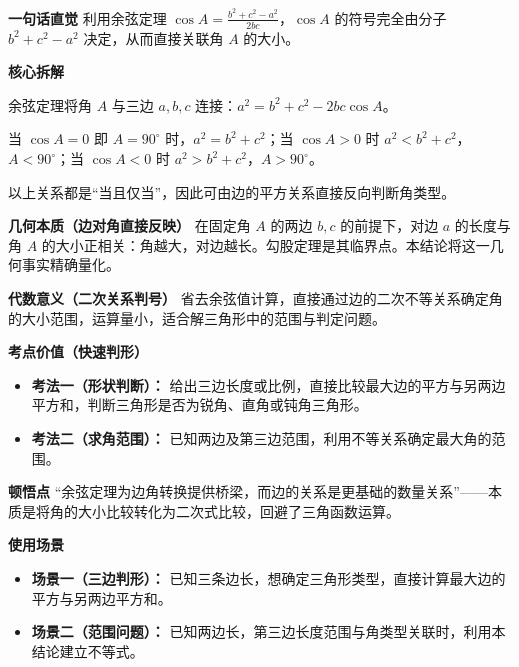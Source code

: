 \begin{explanationbox}
	\textbf{\textcolor{CExplanation}{一句话直觉}}
	利用余弦定理 $\cos A = \frac{b^2+c^2-a^2}{2bc}$，$\cos A$ 的符号完全由分子 $b^2+c^2-a^2$ 决定，从而直接关联角 $A$ 的大小。

	\medskip
	\textbf{\textcolor{CExplanation}{核心拆解}}
	\begin{description}[style=nextline, leftmargin=2.8em, labelsep=0.5em, itemsep=0.45em]
		\item[\textbf{要点一（余弦定理桥梁）：}]
			余弦定理将角 $A$ 与三边 $a,b,c$ 连接：$a^2=b^2+c^2-2bc\cos A$。
		\item[\textbf{要点二（正负分界点）：}]
			当 $\cos A=0$ 即 $A=90^\circ$ 时，$a^2=b^2+c^2$；当 $\cos A>0$ 时 $a^2<b^2+c^2$，$A<90^\circ$；当 $\cos A<0$ 时 $a^2>b^2+c^2$，$A>90^\circ$。
		\item[\textbf{要点三（双向等价）：}]
			以上关系都是“当且仅当”，因此可由边的平方关系直接反向判断角类型。
	\end{description}

	\medskip
	\textbf{\textcolor{CExplanation}{几何本质（边对角直接反映）}}
	在固定角 $A$ 的两边 $b,c$ 的前提下，对边 $a$ 的长度与角 $A$ 的大小正相关：角越大，对边越长。勾股定理是其临界点。本结论将这一几何事实精确量化。

	\medskip
	\textbf{\textcolor{CExplanation}{代数意义（二次关系判号）}}
	省去余弦值计算，直接通过边的二次不等关系确定角的大小范围，运算量小，适合解三角形中的范围与判定问题。

	\medskip
	\textbf{\textcolor{CExplanation}{考点价值（快速判形）}}
	\begin{itemize}[leftmargin=*, itemsep=0.5em, topsep=0.4em]
		\item \textbf{考法一（形状判断）：} 给出三边长度或比例，直接比较最大边的平方与另两边平方和，判断三角形是否为锐角、直角或钝角三角形。
		\item \textbf{考法二（求角范围）：} 已知两边及第三边范围，利用不等关系确定最大角的范围。
	\end{itemize}

	\medskip
	\textbf{\textcolor{CExplanation}{顿悟点}}
	“余弦定理为边角转换提供桥梁，而边的关系是更基础的数量关系”——本质是将角的大小比较转化为二次式比较，回避了三角函数运算。

	\medskip
	\textbf{\textcolor{CExplanation}{使用场景}}
	\begin{itemize}[leftmargin=*, itemsep=0.5em, topsep=0.4em]
		\item \textbf{场景一（三边判形）：} 已知三条边长，想确定三角形类型，直接计算最大边的平方与另两边平方和。
		\item \textbf{场景二（范围问题）：} 已知两边长，第三边长度范围与角类型关联时，利用本结论建立不等式。
	\end{itemize}

\end{explanationbox}

